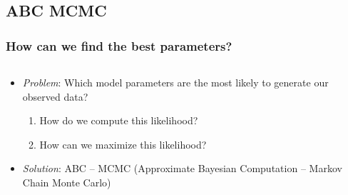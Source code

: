 \documentclass[11pt]{beamer}
\begin{document}
	\subsection{ABC MCMC}\label{subsec:abcmcmc}
    \begin{frame}
        \frametitle{How can we find the best parameters?}
        \begin{columns}
            \begin{column}{0.6\textwidth}
                \begin{itemize}
                    \item \emph{Problem}: Which model parameters are the most likely to generate our observed data?
                        \begin{enumerate}
                            \item How do we compute this likelihood? \smallskip
                            \item How can we maximize this likelihood?
                        \end{enumerate} \bigskip
                    \item \emph{Solution}: ABC -- MCMC (\footnotesize{Approximate Bayesian Computation -- Markov
                        Chain Monte Carlo})
                \end{itemize}
            \end{column}
            \begin{column}{0.4\textwidth}
                \begin{flushleft}
                    
                \end{flushleft}
            \end{column}
        \end{columns}

        \note{
            \footnotesize
            \begin{enumerate}
                \item
            \end{enumerate}
        }
    \end{frame}
\end{document}
